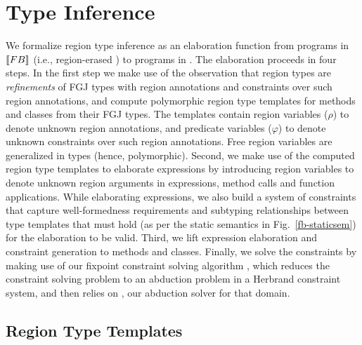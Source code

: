 \section{Type Inference}
\label{sec:type-inference}

We formalize region type inference as an elaboration function from
programs in $\llbracket {\sc FB} \rrbracket$ (i.e., region-erased \FB) to programs in
\FB.  The elaboration proceeds in four steps. In the first step we
make use of the observation that region types are \emph{refinements}
of FGJ types with region annotations and constraints over such region
annotations, and compute polymorphic region type templates for methods
and classes from their FGJ types. The templates contain region
variables ($\rho$) to denote unknown region annotations, and predicate
variables ($\varphi$) to denote unknown constraints over such region
annotations. Free region variables are generalized in types (hence,
polymorphic). Second, we make use of the computed region type
templates to elaborate expressions by introducing region variables to
denote unknown region arguments in  expressions, method calls
and function applications. While elaborating expressions, we also
build a system of constraints that capture well-formedness
requirements and subtyping relationships between type templates that
must hold (as per the static semantics in Fig.~\ref{fb-staticsem}) for
the elaboration to be valid. Third, we lift expression elaboration and
constraint generation to methods and classes. Finally, we solve the
constraints by making use of our fixpoint constraint solving algorithm
\csolvestar, which reduces the constraint solving problem to an
abduction problem in a Herbrand constraint system, and then relies on
\csolve, our abduction solver for that domain. 

\subsection{Region Type Templates}
\label{sec:fb-templatization}

